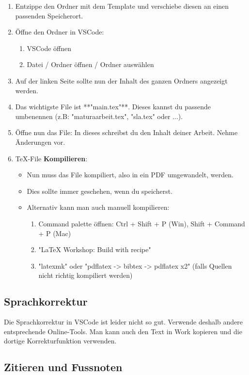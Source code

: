 \documentclass[a4paper,12pt,twoside]{article}
\begin{document}
\begin{enumerate}
	\item Entzippe den Ordner mit dem Template und verschiebe diesen an einen passenden Speicherort.
	\item Öffne den Ordner in VSCode:
	\begin{enumerate}
		\item  VSCode öffnen
		\item  Datei / Ordner öffnen / Ordner auswählen
	\end{enumerate}
	\item Auf der linken Seite sollte nun der Inhalt des ganzen Ordners angezeigt werden.
	\item Das wichtigste File ist **"main.tex"**. Dieses kannst du passende umbenennen (z.B: "maturaarbeit.tex", "sla.tex" oder ...).
	\item Öffne nun das File: In dieses schreibst du den Inhalt deiner Arbeit. Nehme Änderungen vor.
	\item TeX-File \textbf{Kompilieren}:
	\begin{itemize}
		\item Nun muss das File kompiliert, also in ein PDF umgewandelt, werden.
		\item Dies sollte immer geschehen, wenn du speicherst.
		\item Alternativ kann man auch manuell kompilieren:
		\begin{enumerate}
			\item Command palette öffnen: Ctrl + Shift + P (Win), Shift + Command + P (Mac)
			\item "LaTeX Workshop: Build with recipe"
			\item "latexmk" oder "pdflatex -> bibtex -> pdflatex x2" (falls Quellen nicht richtig kompiliert werden)
		\end{enumerate}
	\end{itemize}
\end{enumerate}

\subsection{Sprachkorrektur}

Die Sprachkorrektur in VSCode ist leider nicht so gut. Verwende deshalb andere entsprechende Online-Tools. Man kann auch den Text in Work kopieren und die dortige Korrekturfunktion verwenden.

\subsection{Zitieren und Fussnoten}
\end{document}
